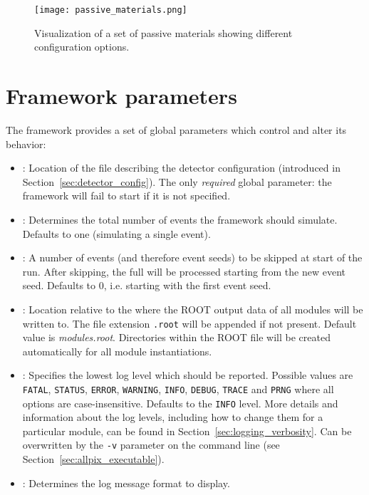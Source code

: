 \begin{figure}[t]
  \centering
  \texttt{[image: passive\_materials.png]}
  \caption{Visualization of a set of passive materials showing different configuration options.}
  \label{fig:passivematerials}
\end{figure}


\section{Framework parameters}
\label{sec:framework_parameters}
The \apsq framework provides a set of global parameters which control and alter its behavior:
\begin{itemize}
\item {}: Location of the file describing the detector configuration (introduced in Section~\ref{sec:detector_config}).
The only \textit{required} global parameter: the framework will fail to start if it is not specified.
\item {}: Determines the total number of events the framework should simulate.
Defaults to one (simulating a single event).
\item {}: A number of events (and therefore event seeds) to be skipped at start of the run. After skipping, the full  will be processed starting from the new event seed. Defaults to 0, i.e. starting with the first event seed.
\item {}: Location relative to the  where the ROOT output data of all modules will be written to. The file extension \texttt{.root} will be appended if not present.
Default value is \textit{modules.root}.
Directories within the ROOT file will be created automatically for all module instantiations.
\item {}: Specifies the lowest log level which should be reported.
Possible values are \texttt{FATAL}, \texttt{STATUS}, \texttt{ERROR}, \texttt{WARNING}, \texttt{INFO}, \texttt{DEBUG}, \texttt{TRACE} and \texttt{PRNG} where all options are case-insensitive.
Defaults to the \texttt{INFO} level.
More details and information about the log levels, including how to change them for a particular module, can be found in Section~\ref{sec:logging_verbosity}.
Can be overwritten by the \texttt{-v} parameter on the command line (see Section~\ref{sec:allpix_executable}).
\item {}: Determines the log message format to display.

\end{itemize}
